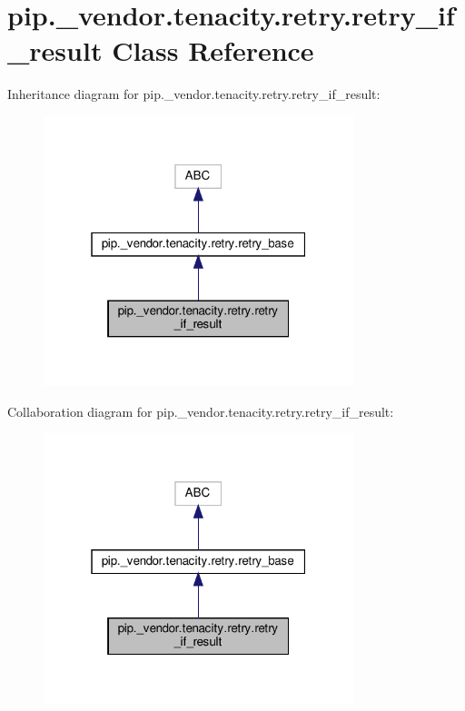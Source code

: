 \hypertarget{classpip_1_1__vendor_1_1tenacity_1_1retry_1_1retry__if__result}{}\section{pip.\+\_\+vendor.\+tenacity.\+retry.\+retry\+\_\+if\+\_\+result Class Reference}
\label{classpip_1_1__vendor_1_1tenacity_1_1retry_1_1retry__if__result}


Inheritance diagram for pip.\+\_\+vendor.\+tenacity.\+retry.\+retry\+\_\+if\+\_\+result\+:
\nopagebreak
\begin{figure}[H]
\begin{center}
\leavevmode
\includegraphics[width=256pt]{classpip_1_1__vendor_1_1tenacity_1_1retry_1_1retry__if__result__inherit__graph}
\end{center}
\end{figure}


Collaboration diagram for pip.\+\_\+vendor.\+tenacity.\+retry.\+retry\+\_\+if\+\_\+result\+:
\nopagebreak
\begin{figure}[H]
\begin{center}
\leavevmode
\includegraphics[width=256pt]{classpip_1_1__vendor_1_1tenacity_1_1retry_1_1retry__if__result__coll__graph}
\end{center}
\end{figure}
